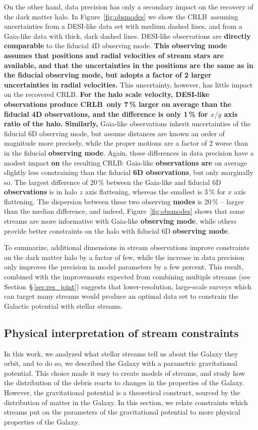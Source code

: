 \documentclass[modern]{aastex62}
\newcommand{\acronym}[1]{{\small{#1}}}
\newcommand{\CRLB}{\acronym{CRLB}}
\begin{document}
On the other hand, data precision has only a secondary impact on the recovery of the dark matter halo.
In Figure~\ref{fig:obsmodes} we show the \CRLB\ assuming uncertainties from a DESI-like data set with medium dashed lines, and from a Gaia-like data with thick, dark dashed lines.
DESI-like observations are {\bf directly comparable} to the fiducial 4D observing mode.
{\bf This observing mode assumes that positions and radial velocities of stream stars are available, and that the uncertainties in the positions are the same as in the fiducial observing mode, but adopts a factor of 2 larger uncertainties in radial velocities.}
This uncertainty, however, has little impact on the recovered \CRLB.
{\bf For the halo scale velocity, DESI-like observations produce \CRLB\ only 7\,\% larger on average than the fiducial 4D observations, and the difference is only 1\,\% for $x/y$ axis ratio of the halo.}
{\bf Similarly,} Gaia-like observations inherit uncertainties of the fiducial 6D observing mode, but assume distances are known an order of magnitude more precisely, while the proper motions are a factor of 2 worse than in the fiducial {\bf observing mode}.
Again, these differences in data precision have a modest impact {\bf on} the resulting \CRLB: Gaia-like {\bf observations are} on average slightly less constraining than the fiducial {\bf 6D observations}, but only marginally so.
The largest difference of 20\,\% between the Gaia-like and fiducial 6D {\bf observations} is in halo $z$ axis flattening, whereas the smallest is 3\,\% for $x$ axis flattening.
The dispersion between these two observing {\bf modes} is 20\,\% -- larger than the median difference, and indeed, Figure~\ref{fig:obsmodes} shows that some streams are more informative with Gaia-like {\bf observing mode}, while others provide better constraints on the halo with fiducial 6D {\bf observing mode}.

To summarize, additional dimensions in stream observations improve constraints on the dark matter halo by a factor of few, while the increase in data precision only improves the precision in model parameters by a few percent.
This result, combined with the improvements expected from combining multiple streams (see Section~\S\,\ref{sec:res_joint}) suggests that lower-resolution, large-scale surveys which can target many streams would produce an optimal data set to constrain the Galactic potential with stellar streams.

\subsection{Physical interpretation of stream constraints}
\label{sec:interpretation}
In this work, we analyzed what stellar streams tell us about the Galaxy they orbit, and to do so, we described the Galaxy with a parametric gravitational potential.
This choice made it easy to create models of streams, and study how the distribution of the debris reacts to changes in the properties of the Galaxy.
However, the gravitational potential is a theoretical construct, sourced by the distribution of matter in the Galaxy.
In this section, we relate constraints which streams put on the parameters of the gravitational potential to more physical properties of the Galaxy.
\end{document}

